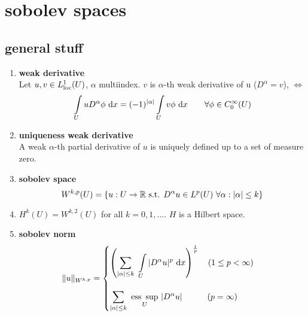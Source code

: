 \section{sobolev spaces}

\subsection{general stuff}

\begin{enumerate}[label=(\alph*)]
	\item \textbf{weak derivative}\\
	Let $u,v \in L^1_{\text{loc}}(U)$, $\alpha$ multiindex. $v$ is $\alpha$-th weak derivative of u ($D^{\alpha} = v$), $\iff$
	\begin{equation*}
	\int \limits_U u D^{\alpha}\phi \text{ d} x = (-1)^{|\alpha|} \int \limits_U v\phi \text{ d} x \qquad \forall \phi \in C^\infty_0(U)
	\end{equation*}
	
	\item \textbf{uniqueness weak derivative}\\
	A weak  $\alpha$-th partial derivative of $u$ is uniquely defined up to a set of measure zero.
	
	\item \textbf{sobolev space}\\
	\begin{equation*}
		W^{k,p}(U) = \{ u: U \to \mathbb{R} \text{ s.t. } D^{\alpha}u \in L^p(U)\  \forall \alpha: |\alpha| \leq k \}
	\end{equation*}
	\item $H^k(U) = W^{k,2}(U)$ for all $k = 0,1,\dots$. $H$ is a Hilbert space.
	
	\item \textbf{sobolev norm}
	\begin{equation*}
		\|u\|_{W^{k,p}} = 
		\begin{cases}
		\left( \displaystyle \sum_{|\alpha|\leq k}\  \int \limits_U |D^{\alpha}u|^p  \text{ d} x \right)^{\frac{1}{p}} \quad (1 \leq p< \infty)\\
		\\
		\displaystyle \sum_{|\alpha|\leq k}\  \underset{U}{\text{ess }\sup}\  |D^{\alpha}u| \qquad \quad  (p = \infty)
		\end{cases}
	\end{equation*}
	

\end{enumerate}
